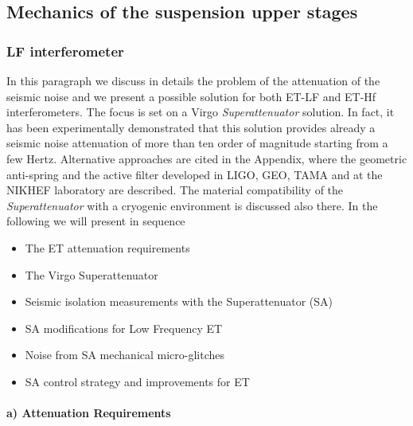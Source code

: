 \FloatBarrier
\subsection{Mechanics of the suspension upper stages }
\label{sec:Upper_stages_mechanics}
\FloatBarrier
\subsubsection{LF interferometer}

In this paragraph we discuss in details the problem of the attenuation of the seismic noise  and we present  a possible solution for both ET-LF and ET-Hf interferometers.  The focus is set on a Virgo {\emph {Superattenuator}} solution. In fact, it has been experimentally demonstrated \cite{Collaboration2010} that this solution provides already a seismic noise attenuation of  more than ten order of magnitude starting from a few Hertz.  Alternative approaches are cited in the Appendix, where the geometric anti-spring and the active filter developed in LIGO, GEO, TAMA  and at the NIKHEF laboratory are  described. The material compatibility of the \emph{Superattenuator} with a cryogenic environment is discussed also there.
In the following we will present in sequence

\begin{itemize}
\item  The ET attenuation requirements
\item The Virgo Superattenuator
\item Seismic isolation measurements with the Superattenuator (SA)
\item SA modifications for Low Frequency ET
\item Noise from SA mechanical micro-glitches
\item SA control strategy and improvements for ET
\end{itemize}

\paragraph{a) Attenuation Requirements} 

